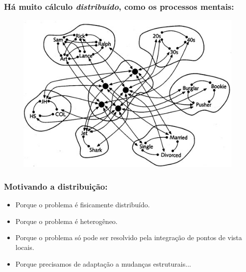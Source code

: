 
\begin{frame} %

  \frametitle{Há muito cálculo \textit{distribuído}, como os processos mentais:}
        
\begin{figure}[!ht]
\centering
\includegraphics[height =.6\textheight,width=.8\textwidth]{figuras/processamento_mental_01.jpg}
\end{figure}
    
\end{frame}





\begin{frame} %


\frametitle{Motivando a distribuição:}

\begin{itemize}
  \item Porque o problema é fisicamente distribuído.
  \item Porque o problema é heterogêneo.
  \item Porque o problema só pode ser resolvido pela integração de pontos de vista locais.
  \item Porque precisamos de adaptação a mudanças estruturais...

\end{itemize}

\end{frame}


